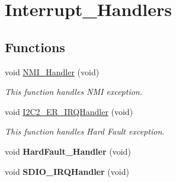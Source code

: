 \hypertarget{group___interrupt___handlers}{
\section{Interrupt\_\-Handlers}
\label{group___interrupt___handlers}
}
\subsection*{Functions}
\begin{DoxyCompactItemize}
\item 
void \hyperlink{group___interrupt___handlers_ga6ad7a5e3ee69cb6db6a6b9111ba898bc}{NMI\_\-Handler} (void)
\begin{DoxyCompactList}\small\item\em This function handles NMI exception. \end{DoxyCompactList}\item 
void \hyperlink{group___interrupt___handlers_gaecd40b8012604ac4236bda3f65857c37}{I2C2\_\-ER\_\-IRQHandler} (void)
\begin{DoxyCompactList}\small\item\em This function handles Hard Fault exception. \end{DoxyCompactList}\item 
\hypertarget{group___interrupt___handlers_ga2bffc10d5bd4106753b7c30e86903bea}{
void {\bfseries HardFault\_\-Handler} (void)}
\label{group___interrupt___handlers_ga2bffc10d5bd4106753b7c30e86903bea}

\item 
\hypertarget{group___interrupt___handlers_gadb3e01a3e924c7c52cad43949a43e9c7}{
void {\bfseries SDIO\_\-IRQHandler} (void)}
\label{group___interrupt___handlers_gadb3e01a3e924c7c52cad43949a43e9c7}


\end{DoxyCompactItemize}

